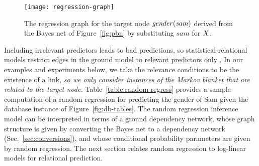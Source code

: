 \documentclass[twoside,leqno,twocolumn]{article}
\begin{document}
\begin{figure}
\begin{center}
\texttt{[image: regression-graph]}
\caption{%
The regression graph for the target node $\it{gender}(sam)$ derived from the Bayes net of Figure~\ref{fig:pbn} by substituting $sam$ for $X$.
 \label{fig:regress}}
\end{center}
\end{figure}



Including irrelevant predictors leads to bad predictions, so statistical-relational models restrict edges in the ground model to relevant predictors only \cite{Poole2003}. %
In our examples and experiments below, we take the relevance conditions to be the existence of a link, {\em so we only consider instances of the Markov blanket that are related to the target node.} Table~\ref{table:random-regress} provides a sample computation of a random regression for predicting the gender of Sam given the database instance of Figure~\ref{fig:db-tables}. The random regression inference model can be interpreted in terms of a ground dependency network, whose graph structure is given by converting the Bayes net to a dependency network (Sec.~\ref{sec:conversions}), and whose conditional probability parameters are given by random regression. The next section relates random regression to log-linear models for relational prediction.
\end{document}
